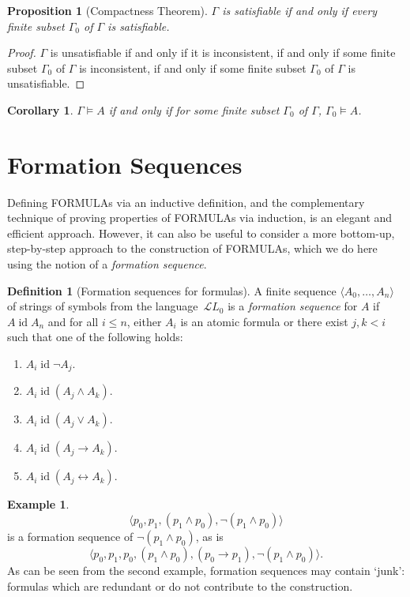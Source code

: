 \documentclass[10pt,a4paper]{article}
\newcommand*{\olup}[1]{\MakeUppercase{#1}}
\theoremstyle{plain}
\newtheorem{prop}[thm]{Proposition}
\newtheorem{cor}[thm]{Corollary}
\theoremstyle{definition}
\newtheorem{defn}[thm]{Definition}
\newtheorem{ex}[thm]{Example}
\theoremstyle{remark}
\newcommand*{\olfileid}[3]{}
\newcommand*{\olsection}[1]{\section*{#1}}
\newcommand*{\ollabel}[1]{\label{#1}}
\providecommand{\lif}{\mathbin{\rightarrow}}
\providecommand{\Entails}{\mathrel{\models}}
\providecommand{\Obj}{}
\providecommand{\Lang}{\ensuremath{\mathcal{L}}}
\providecommand{\tuple}[1]{\langle #1 \rangle}
\providecommand{\tagitem}[1]{\item[#1]}
\providecommand{\liff}{\mathbin{\leftrightarrow}}
\providecommand{\ident}{\operatorname{id}}
\begin{document}
\begin{prop}[Compactness Theorem]
\ollabel{prop:compactness}
$\Gamma$ is satisfiable if and only if every \emph{finite} subset
$\Gamma_0$ of $\Gamma$ is satisfiable.
\end{prop}

\begin{proof}
$\Gamma$ is unsatisfiable if and only if it is inconsistent, if and
  only if some finite subset $\Gamma_0$ of $\Gamma$ is inconsistent,
  if and only if some finite subset $\Gamma_0$ of $\Gamma$ is
  unsatisfiable.
\end{proof}

\begin{cor}
$\Gamma \Entails A$ if and only if for some finite subset
$\Gamma_0$ of $\Gamma$, $\Gamma_0 \Entails A$.
\end{cor}





\olfileid{pl}{syn}{fseq}

\olsection{Formation Sequences}

Defining \olup{formula}s via an inductive definition, and the
complementary technique of proving properties of \olup{formula}s via
induction, is an elegant and efficient approach. However, it can
also be useful to consider a more bottom-up, step-by-step approach
to the construction of \olup{formula}s, which we do here using the
notion of a \emph{formation sequence}.

\begin{defn}[Formation sequences for formulas]
\ollabel{defn:fseq-frm}
A finite sequence $\tuple{A_0,\dotsc,A_n}$ of strings of
symbols from the language~$\Lang L_0$ is a \emph{formation
sequence} for $A$ if $A \ident A_n$ and for all $i \leq n$,
either $A_i$ is an atomic formula or there exist $j,k < i$
such that one of the following holds:
\begin{enumerate}
    \tagitem{prvNot}{$A_i \ident \lnot A_j$.}{}%
    \tagitem{prvAnd}{$A_i \ident (A_j \land A_k)$.}{}%
    \tagitem{prvOr}{$A_i \ident (A_j \lor A_k)$.}{}%
    \tagitem{prvIf}{$A_i \ident (A_j \lif A_k)$.}{}%
    \tagitem{prvIff}{$A_i \ident (A_j \liff A_k)$.}{}%
\end{enumerate}
\end{defn}

\begin{ex}
\[
\tuple{
    \Obj p_0,
    \Obj p_1,
    (\Obj p_1 \land \Obj p_0),
    \lnot (\Obj p_1 \land \Obj p_0)
}
\]
is a formation sequence of
$\lnot (\Obj p_1 \land \Obj p_0)$, as is
\[
\tuple{
    \Obj p_0,
    \Obj p_1,
    \Obj p_0,
    (\Obj p_1 \land \Obj p_0),
    (\Obj p_0 \lif \Obj p_1),
    \lnot (\Obj p_1 \land \Obj p_0)
}.
\]
%
As can be seen from the second example, formation sequences
may contain `junk': formulas which are redundant or do not
contribute to the construction.
\end{ex}
\end{document}
